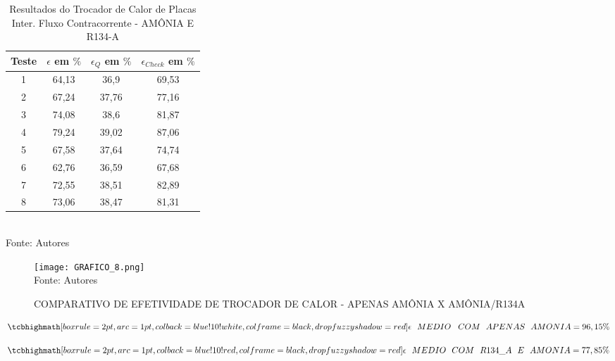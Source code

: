 \documentclass[a4paper,12pt,oneside]{article}
\begin{document}
\begin{flushright}
\pagebreak
\clearpage
\newpage
\begin{table}[h]
	\caption{Resultados do Trocador de Calor de Placas Inter. Fluxo Contracorrente - AMÔNIA E R134-A}
	\vspace{0.8cm}
	\centering
	\begin{tabular}{| c | c | c | c |}
	\hline
	Teste & $\epsilon$ em $\%$& $\epsilon_{Q}$ em $\%$& $\epsilon_{Check}$ em $\%$ \\
	\hline
	1 &64,13  & 36,9& 69,53 \\
	\hline
	2 &67,24 & 37,76 & 77,16 \\
	\hline
	3 &74,08 & 38,6 & 81,87\\
	\hline
	4 &79,24& 39,02 & 87,06\\
	\hline
	5 &67,58& 37,64 & 74,74\\
	\hline
	6 &62,76 & 36,59 & 67,68\\
	\hline
	7 &72,55 & 38,51& 82,89\\
	\hline
	8 &73,06& 38,47 & 81,31\\
	\hline
	\end{tabular}\\
	\vspace{0.8cm}
	Fonte: Autores
	\vspace{1cm}
\end{table}

\pagebreak
\clearpage
\newpage

\begin{figure}[h]
	\centering
	\caption{COMPARATIVO DE EFETIVIDADE DE TROCADOR DE CALOR - APENAS AMÔNIA X AMÔNIA/R134A}
	\vspace{0.5cm}
	\texttt{[image: GRAFICO\_8.png]}
	\vspace{0.5cm}\\
	Fonte: Autores
\end{figure}
\vspace{0.5cm}

\begin{equation}
	\tcbhighmath[boxrule=2pt,arc=1pt,colback=blue!10!white,colframe=black,
	drop fuzzy shadow=red]{\epsilon\,\,\,\,MEDIO\,\,\,\,\,COM\,\,\,\,APENAS\,\,\,\,AMONIA = 96,15\%}
\end{equation}
\vspace{0.5cm}

\begin{equation}
	\tcbhighmath[boxrule=2pt,arc=1pt,colback=blue!10!red,colframe=black,
	drop fuzzy shadow=red]{\epsilon\,\,\,\,MEDIO\,\,\,\,COM\,\,\,\,R134\_A\,\,\,\,E\,\,\,\,AMONIA = 77,85\%}
\end{equation}
\vspace{0.5cm}


\end{flushright}
\end{document}
